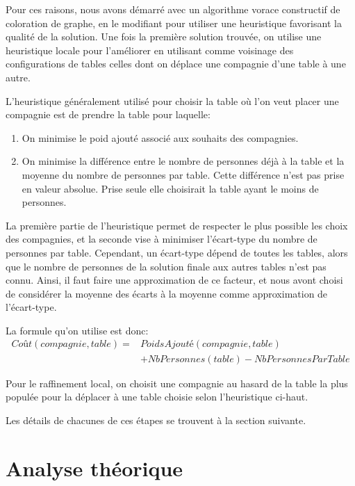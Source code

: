 \documentclass[letterpaper,12pt,final]{article}
\begin{document}
Pour ces raisons, nous avons démarré avec un algorithme vorace
constructif de coloration de graphe, en le modifiant pour utiliser une
heuristique favorisant la qualité de la solution.  Une fois la
première solution trouvée, on utilise une heuristique locale pour
l'améliorer en utilisant comme voisinage des configurations de tables
celles dont on déplace une compagnie d'une table à une autre.

L'heuristique généralement utilisé pour choisir la table où l'on veut
placer une compagnie est de prendre la table pour laquelle:

\begin{enumerate}
\item On minimise le poid ajouté associé aux souhaits des compagnies.
\item On minimise la différence entre le nombre de personnes déjà à la
  table et la moyenne du nombre de personnes par table. Cette
  différence n'est pas prise en valeur absolue. Prise seule elle
  choisirait la table ayant le moins de personnes.
\end{enumerate}

La première partie de l'heuristique permet de respecter le plus
possible les choix des compagnies, et la seconde vise à minimiser
l'écart-type du nombre de personnes par table. Cependant, un
écart-type dépend de toutes les tables, alors que le nombre de
personnes de la solution finale aux autres tables n'est pas
connu. Ainsi, il faut faire une approximation de ce facteur, et nous
avont choisi de considérer la moyenne des écarts à la moyenne comme
approximation de l'écart-type.

La formule qu'on utilise est donc:
\begin{equation}
  \begin{split}
    Coût(compagnie, table) = & PoidsAjouté(compagnie, table) \\
    & + NbPersonnes(table) - NbPersonnesParTable
  \end{split}
\end{equation}

Pour le raffinement local, on choisit une compagnie au hasard de la
table la plus populée pour la déplacer à une table choisie selon
l'heuristique ci-haut.

Les détails de chacunes de ces étapes se trouvent à la section
suivante.

\section{Analyse théorique}
\end{document}
